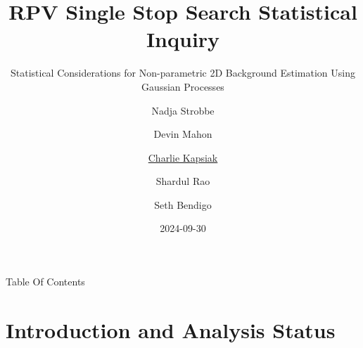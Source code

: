 \documentclass[10pt]{beamer}
\author[Charlie Kapsiak (UMN Single Stop Group) ]{
  Nadja Strobbe\inst{1} \and
  Devin Mahon\inst{1} \and
  \underline{Charlie Kapsiak}\inst{1} \and
  Shardul Rao\inst{1} \and
  Seth Bendigo\inst{1}
}
\institute{\inst{1}University of Minnesota}
\title[Single Stop Statistics]{RPV Single Stop Search Statistical Inquiry}
\subtitle{Statistical Considerations for Non-parametric 2D Background Estimation Using Gaussian Processes}
\date{2024-09-30}
\begin{document}
\begin{frame}
  \maketitle
\end{frame}

\begin{frame}{Table Of Contents}
  \tableofcontents
\end{frame}

%   
%     
%   
%   
%   
%   

\section[Intro]{Introduction and Analysis Status}
\end{document}
